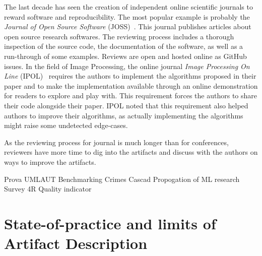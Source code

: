 \documentclass[sigconf,natbib=false]{acmart}
\newcommand{\ad}{Artifact Description}
\newcommand{\aeval}{Artifact Evaluation}
\newcommand{\adae}{\ad/\aeval}
\newcommand{\todo}[1]{{\color{red}{TODO: #1}}}
\begin{document}
The last decade has seen the creation of independent online scientific journals to reward software and reproducibility.
The most popular example is probably the \emph{Journal of Open Source Software} (JOSS)\ \cite{smith2018journal}.
This journal publishes articles about open source research softwares.
The reviewing process includes a thorough inspection of the source code, the documentation of the software, as well as a run-through of some examples.
Reviews are open and hosted online as GitHub issues.
In the field of Image Processing, the online journal \emph{Image Processing On Line} (IPOL)\ \cite{colom2015ipol} requires the authors to implement the algorithms proposed in their paper and to make the implementation available through an online demonstration for readers to explore and play with.
This requirement forces the authors to share their code alongside their paper.
IPOL noted that this requirement also helped authors to improve their algorithms, as actually implementing the algorithms might raise some undetected edge-cases.

As the reviewing process for journal is much longer than for conferences, reviewers have more time to dig into the artifacts and discuss with the authors on ways to improve the artifacts.



Prova \cite{guerrera2019reproducible}
UMLAUT \cite{umlaut}
Benchmarking Crimes \cite{van2018benchmarking}
Cascad \cite{perignon2019certify}
Propogation of ML research  \cite{kang2023papers}
Survey 4R \cite{hernandez2023repeatability}
Quality indicator \cite{castell2024towards}
\cite{winter2022retrospective}
\cite{hermann2022has}



%
%

%
\section{State-of-practice and limits of \ad}\label{sec:sop}
\end{document}
